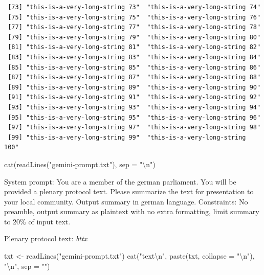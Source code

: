 \documentclass[
  letterpaper,
  DIV=11,
  numbers=noendperiod]{scrartcl}
\newenvironment{Shaded}{\begin{snugshade}}{\end{snugshade}}
\newcommand{\AttributeTok}[1]{\textcolor[rgb]{0.40,0.45,0.13}{#1}}
\newcommand{\FunctionTok}[1]{\textcolor[rgb]{0.28,0.35,0.67}{#1}}
\newcommand{\NormalTok}[1]{\textcolor[rgb]{0.00,0.23,0.31}{#1}}
\newcommand{\OtherTok}[1]{\textcolor[rgb]{0.00,0.23,0.31}{#1}}
\newcommand{\SpecialCharTok}[1]{\textcolor[rgb]{0.37,0.37,0.37}{#1}}
\newcommand{\StringTok}[1]{\textcolor[rgb]{0.13,0.47,0.30}{#1}}
\begin{document}
\begin{verbatim}
 [73] "this-is-a-very-long-string 73"  "this-is-a-very-long-string 74" 
 [75] "this-is-a-very-long-string 75"  "this-is-a-very-long-string 76" 
 [77] "this-is-a-very-long-string 77"  "this-is-a-very-long-string 78" 
 [79] "this-is-a-very-long-string 79"  "this-is-a-very-long-string 80" 
 [81] "this-is-a-very-long-string 81"  "this-is-a-very-long-string 82" 
 [83] "this-is-a-very-long-string 83"  "this-is-a-very-long-string 84" 
 [85] "this-is-a-very-long-string 85"  "this-is-a-very-long-string 86" 
 [87] "this-is-a-very-long-string 87"  "this-is-a-very-long-string 88" 
 [89] "this-is-a-very-long-string 89"  "this-is-a-very-long-string 90" 
 [91] "this-is-a-very-long-string 91"  "this-is-a-very-long-string 92" 
 [93] "this-is-a-very-long-string 93"  "this-is-a-very-long-string 94" 
 [95] "this-is-a-very-long-string 95"  "this-is-a-very-long-string 96" 
 [97] "this-is-a-very-long-string 97"  "this-is-a-very-long-string 98" 
 [99] "this-is-a-very-long-string 99"  "this-is-a-very-long-string 100"
\end{verbatim}

\begin{Shaded}
\begin{Highlighting}[]
\FunctionTok{cat}\NormalTok{(}\FunctionTok{readLines}\NormalTok{(}\StringTok{"gemini{-}prompt.txt"}\NormalTok{), }\AttributeTok{sep =} \StringTok{"}\SpecialCharTok{\textbackslash{}n}\StringTok{"}\NormalTok{)}
\end{Highlighting}
\end{Shaded}

System prompt: You are a member of the german parliament. You will be
provided a plenary protocol text. Please summarize the text for
presentation to your local community. Output summary in german language.
Constraints: No preamble, output summary as plaintext with no extra
formatting, limit summary to 20\% of input text.

Plenary protocol text: \emph{bttx}

\begin{Shaded}
\begin{Highlighting}[]
\NormalTok{txt }\OtherTok{\textless{}{-}} \FunctionTok{readLines}\NormalTok{(}\StringTok{"gemini{-}prompt.txt"}\NormalTok{)}
\FunctionTok{cat}\NormalTok{(}\StringTok{"\textasciigrave{}\textasciigrave{}\textasciigrave{}text}\SpecialCharTok{\textbackslash{}n}\StringTok{"}\NormalTok{,}
    \FunctionTok{paste}\NormalTok{(txt, }\AttributeTok{collapse =} \StringTok{"}\SpecialCharTok{\textbackslash{}n}\StringTok{"}\NormalTok{),}
    \StringTok{"}\SpecialCharTok{\textbackslash{}n}\StringTok{\textasciigrave{}\textasciigrave{}\textasciigrave{}"}\NormalTok{,}
    \AttributeTok{sep =} \StringTok{""}\NormalTok{)}
\end{Highlighting}
\end{Shaded}
\end{document}
